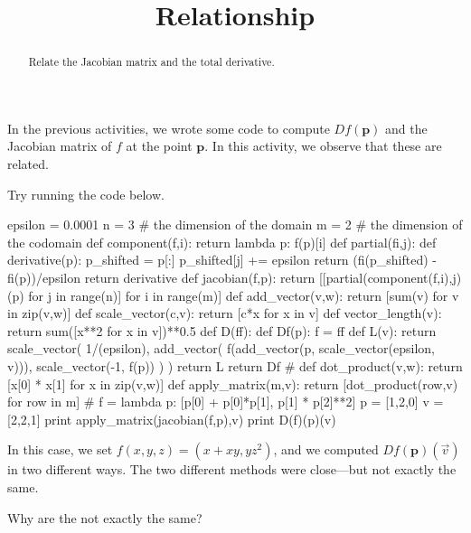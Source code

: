 \documentclass{ximera}
\title{Relationship}
\begin{document}
\begin{abstract}
  Relate the Jacobian matrix and the total derivative.
\end{abstract}

In the previous activities, we wrote some code to compute
$Df(\mathbf{p})$ and the Jacobian matrix of $f$ at the point
$\mathbf{p}$.  In this activity, we observe that these are related.

Try running the code below.
    \begin{python}
epsilon = 0.0001
n = 3 # the dimension of the domain
m = 2 # the dimension of the codomain
def component(f,i):
  return lambda p: f(p)[i]
def partial(fi,j):
  def derivative(p):
    p_shifted = p[:]
    p_shifted[j] += epsilon
    return (fi(p_shifted) - fi(p))/epsilon
  return derivative
def jacobian(f,p):
  return [[partial(component(f,i),j)(p) for j in range(n)] for i in range(m)]
def add_vector(v,w):
  return [sum(v) for v in zip(v,w)]
def scale_vector(c,v):
  return [c*x for x in v]
def vector_length(v):
  return sum([x**2 for x in v])**0.5
def D(ff):
  def Df(p):
    f = ff
    def L(v):
      return scale_vector( 1/(epsilon),
                           add_vector( f(add_vector(p, scale_vector(epsilon, v))),
                                       scale_vector(-1, f(p)) ) )
    return L
  return Df
#
def dot_product(v,w):
  return [x[0] * x[1] for x in zip(v,w)]
def apply_matrix(m,v):
  return [dot_product(row,v) for row in m]
#
f = lambda p: [p[0] + p[0]*p[1], p[1] * p[2]**2]
p = [1,2,0]
v = [2,2,1]
print apply_matrix(jacobian(f,p),v)
print D(f)(p)(v)
    \end{python}
    In this case, we set $f(x,y,z) = (x + xy, yz^2)$, and we computed
    $Df(\mathbf{p})(\vec{v})$ in two different ways.  The two different methods were close---but not exactly the same.

Why are the not exactly the same?
\end{document}
